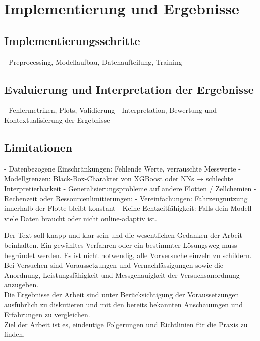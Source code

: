 
\chapter{Implementierung und Ergebnisse}

\section{Implementierungsschritte}

- Preprocessing, Modellaufbau, Datenaufteilung, Training

\section{Evaluierung und Interpretation der Ergebnisse}

- Fehlermetriken, Plots, Validierung
- Interpretation, Bewertung und Kontextualisierung der Ergebnisse

\section{Limitationen}

- Datenbezogene Einschränkungen: Fehlende Werte, verrauschte Messwerte
- Modellgrenzen: Black-Box-Charakter von XGBoost oder NNs → schlechte Interpretierbarkeit
- Generalisierungsprobleme auf andere Flotten / Zellchemien
- Rechenzeit oder Ressourcenlimitierungen:
- Vereinfachungen: Fahrzeugnutzung innerhalb der Flotte bleibt konstant
- Keine Echtzeitfähigkeit: Falls dein Modell viele Daten braucht oder nicht online-adaptiv ist.

Der Text soll knapp und klar sein und die wesentlichen Gedanken der Arbeit beinhalten. Ein gewähltes Verfahren oder ein bestimmter Lösungsweg muss begründet werden. Es ist nicht notwendig, alle Vorversuche einzeln zu schildern. Bei Versuchen sind Voraussetzungen und Vernachlässigungen sowie die Anordnung, Leistungsfähigkeit und Messgenauigkeit der Versuchsanordnung anzugeben. \\ Die Ergebnisse der Arbeit sind unter Berücksichtigung der Voraussetzungen ausführlich zu diskutieren und mit den bereits bekannten Anschauungen und Erfahrungen zu vergleichen. \\ Ziel der Arbeit ist es, eindeutige Folgerungen und Richtlinien für die Praxis zu finden.
